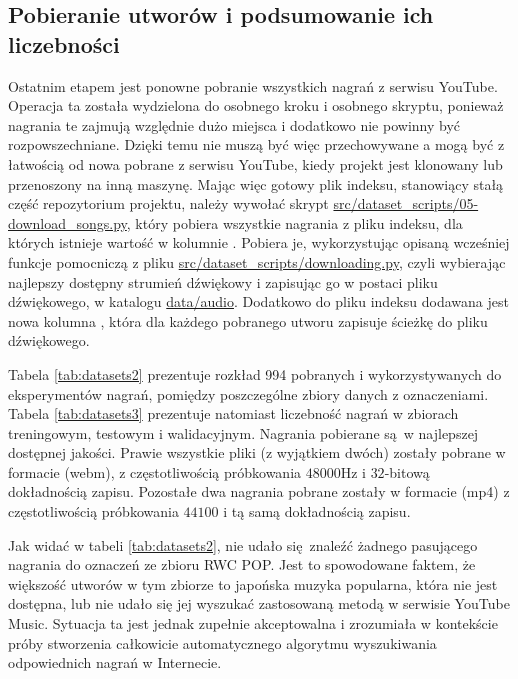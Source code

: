 \subsection{Pobieranie utworów i podsumowanie ich liczebności}

Ostatnim etapem jest ponowne pobranie wszystkich nagrań z serwisu YouTube. Operacja ta została
wydzielona do osobnego kroku i osobnego skryptu, ponieważ nagrania te zajmują względnie dużo miejsca
i dodatkowo nie powinny być rozpowszechniane. Dzięki temu nie muszą być więc przechowywane a mogą
być z łatwością od nowa pobrane z serwisu YouTube, kiedy projekt jest klonowany lub przenoszony na
inną maszynę. Mając więc gotowy plik indeksu, stanowiący stałą część repozytorium projektu, należy
wywołać skrypt \url{src/dataset\_scripts/05-download\_songs.py}, który pobiera wszystkie nagrania z
pliku indeksu, dla których istnieje wartość w kolumnie . Pobiera je, wykorzystując
opisaną wcześniej funkcje pomocniczą z pliku \url{src/dataset\_scripts/downloading.py}, czyli
wybierając najlepszy dostępny strumień dźwiękowy i zapisując go w postaci pliku dźwiękowego, w
katalogu \url{data/audio}. Dodatkowo do pliku indeksu dodawana jest nowa kolumna
, która dla każdego pobranego utworu zapisuje ścieżkę do pliku dźwiękowego.

Tabela \ref{tab:datasets2} prezentuje rozkład 994 pobranych i wykorzystywanych do eksperymentów
nagrań, pomiędzy poszczególne zbiory danych z oznaczeniami. Tabela \ref{tab:datasets3} prezentuje
natomiast liczebność nagrań w zbiorach treningowym, testowym i walidacyjnym. Nagrania pobierane są w
najlepszej dostępnej jakości. Prawie wszystkie pliki (z wyjątkiem dwóch) zostały pobrane w formacie
\filetype(webm), z częstotliwością próbkowania $48000$Hz i $32$-bitową dokładnością zapisu.
Pozostałe dwa nagrania pobrane zostały w formacie \filetype(mp4) z częstotliwością próbkowania
$44100$ i tą samą dokładnością zapisu.

Jak widać w tabeli \ref{tab:datasets2}, nie udało się znaleźć żadnego pasującego nagrania do
oznaczeń ze zbioru RWC POP. Jest to spowodowane faktem, że większość utworów w tym zbiorze to
japońska muzyka popularna, która nie jest dostępna, lub nie udało się jej wyszukać zastosowaną
metodą w serwisie YouTube Music. Sytuacja ta jest jednak zupełnie akceptowalna i zrozumiała w
kontekście próby stworzenia całkowicie automatycznego algorytmu wyszukiwania odpowiednich nagrań w
Internecie.

